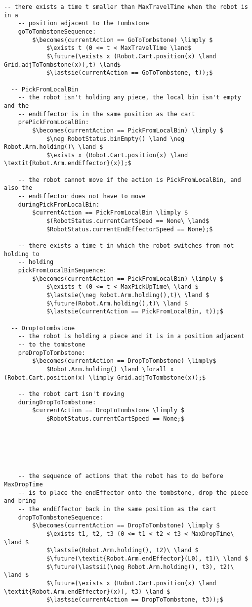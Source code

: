 \begin{lstlisting}[fontadjust, mathescape, frame=single]
    -- there exists a time t smaller than MaxTravelTime when the robot is in a 
    -- position adjacent to the tombstone
    goToTombstoneSequence:
        $\becomes(currentAction == GoToTombstone) \limply $
            $\exists t (0 <= t < MaxTravelTime \land$
            $\future(\exists x (Robot.Cart.position(x) \land Grid.adjToTombstone(x)),t) \land$
            $\lastsie(currentAction == GoToTombstone, t));$

  -- PickFromLocalBin
    -- the robot isn't holding any piece, the local bin isn't empty and the 
    -- endEffector is in the same position as the cart
    prePickFromLocalBin:
        $\becomes(currentAction == PickFromLocalBin) \limply $
            $\neg RobotStatus.binEmpty() \land \neg Robot.Arm.holding()\ \land $
            $\exists x (Robot.Cart.position(x) \land \textit{Robot.Arm.endEffector}(x));$
    
    -- the robot cannot move if the action is PickFromLocalBin, and also the 
    -- endEffector does not have to move
    duringPickFromLocalBin:
        $currentAction == PickFromLocalBin \limply $
            $(RobotStatus.currentCartSpeed == None\ \land$
            $RobotStatus.currentEndEffectorSpeed == None);$
  
    -- there exists a time t in which the robot switches from not holding to 
    -- holding
    pickFromLocalBinSequence:
        $\becomes(currentAction == PickFromLocalBin) \limply $
            $\exists t (0 <= t < MaxPickUpTime\ \land $
            $\lastsie(\neg Robot.Arm.holding(),t)\ \land $
            $\future(Robot.Arm.holding(),t)\ \land $
            $\lastsie(currentAction == PickFromLocalBin, t));$

  -- DropToTombstone
    -- the robot is holding a piece and it is in a position adjacent 
    -- to the tombstone
    preDropToTombstone:
        $\becomes(currentAction == DropToTombstone) \limply$
            $Robot.Arm.holding() \land \forall x (Robot.Cart.position(x) \limply Grid.adjToTombstone(x));$

    -- the robot cart isn't moving
    duringDropToTombstone:
        $currentAction == DropToTombstone \limply $
            $RobotStatus.currentCartSpeed == None;$






    -- the sequence of actions that the robot has to do before MaxDropTime 
    -- is to place the endEffector onto the tombstone, drop the piece and bring 
    -- the endEffector back in the same position as the cart
    dropToTombstoneSequence:
        $\becomes(currentAction == DropToTombstone) \limply $
            $\exists t1, t2, t3 (0 <= t1 < t2 < t3 < MaxDropTime\ \land $
            $\lastsie(Robot.Arm.holding(), t2)\ \land $
            $\future(\textit{Robot.Arm.endEffector}(L0), t1)\ \land $
            $\future(\lastsii(\neg Robot.Arm.holding(), t3), t2)\ \land $
            $\future(\exists x (Robot.Cart.position(x) \land \textit{Robot.Arm.endEffector}(x)), t3) \land $
            $\lastsie(currentAction == DropToTombstone, t3));$


\end{lstlisting}
